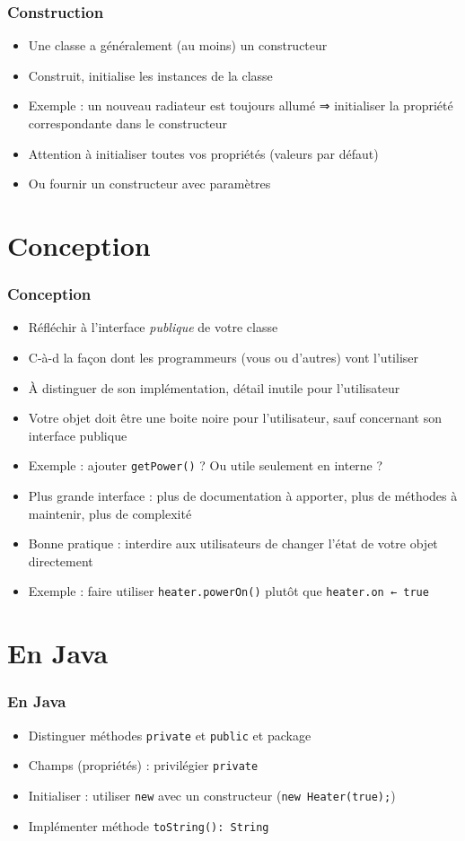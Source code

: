 \documentclass[english, french]{beamer}
\begin{document}
\begin{frame}
	\frametitle{Construction}
	\begin{itemize}
		\item Une classe a {\tiny généralement} (au moins) un constructeur
		\item Construit, initialise les instances de la classe
		\item Exemple : un nouveau radiateur est toujours allumé ⇒ initialiser la propriété correspondante dans le constructeur
		\item Attention à initialiser toutes vos propriétés (valeurs par défaut)
		\item Ou fournir un constructeur avec paramètres
	\end{itemize}
\end{frame}

\section{Conception}
\begin{frame}
	\frametitle{Conception}
	\begin{itemize}
		\item Réfléchir à l’interface \emph{publique} de votre classe
		\item C-à-d la façon dont les programmeurs (vous ou d’autres) vont l’utiliser
		\item À distinguer de son implémentation, détail inutile pour l’utilisateur
		\item Votre objet doit être une boite noire pour l’utilisateur, sauf concernant son interface publique
		\item Exemple : ajouter \texttt{getPower()} ? Ou utile seulement en interne ?
		\item Plus grande interface : plus de documentation à apporter, plus de méthodes à maintenir, plus de complexité
		\item Bonne pratique : interdire aux utilisateurs de changer l’état de votre objet directement
		\item Exemple : faire utiliser \texttt{heater.powerOn()} plutôt que \texttt{heater.on ← true}
	\end{itemize}
\end{frame}

\section{En Java}
\begin{frame}
	\frametitle{En Java}
	\begin{itemize}
		\item Distinguer méthodes \texttt{private} et \texttt{public} {\tiny et package}
		\item Champs (propriétés) : privilégier \texttt{private}
		\item Initialiser : utiliser \texttt{new} avec un constructeur (\texttt{new Heater(true);})
		\item Implémenter méthode \texttt{toString(): String}
	\end{itemize}
\end{frame}
\end{document}
